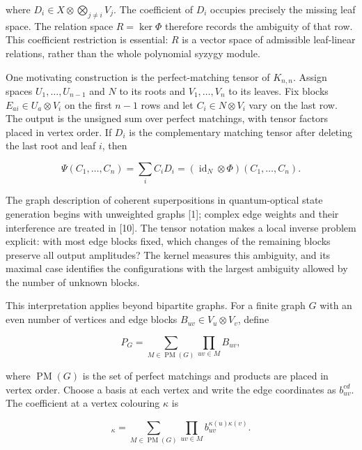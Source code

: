 \documentclass[11pt]{article}
\begin{document}
where $D_i\in X\otimes\bigotimes_{j\ne i}V_j$. The coefficient of $D_i$ occupies precisely the missing leaf space. The relation space $R=\ker\Phi$ therefore records the ambiguity of that row. This coefficient restriction is essential: $R$ is a vector space of admissible leaf-linear relations, rather than the whole polynomial syzygy module.


One motivating construction is the perfect-matching tensor of $K_{n,n}$. Assign spaces $U_1,\ldots,U_{n-1}$ and $N$ to its roots and $V_1,\ldots,V_n$ to its leaves. Fix blocks $E_{ai}\in U_a\otimes V_i$ on the first $n-1$ rows and let $C_i\in N\otimes V_i$ vary on the last row. The output is the unsigned sum over perfect matchings, with tensor factors placed in vertex order. If $D_i$ is the complementary matching tensor after deleting the last root and leaf $i$, then


\nopagebreak[4]

\begin{equation}
\Psi(C_1,\ldots,C_n)=\sum_i C_iD_i
= (\operatorname{id}_N\otimes\Phi)(C_1,\ldots,C_n).
\tag{2}
\end{equation}

The graph description of coherent superpositions in quantum-optical state generation begins with unweighted graphs [1]; complex edge weights and their interference are treated in [10]. The tensor notation makes a local inverse problem explicit: with most edge blocks fixed, which changes of the remaining blocks preserve all output amplitudes? The kernel measures this ambiguity, and its maximal case identifies the configurations with the largest ambiguity allowed by the number of unknown blocks.


This interpretation applies beyond bipartite graphs. For a finite graph $G$ with an even number of vertices and edge blocks $B_{uv}\in V_u\otimes V_v$, define


\nopagebreak[4]

\begin{equation*}
P_G=\sum_{M\in\operatorname{PM}(G)}\prod_{uv\in M}B_{uv},
\end{equation*}

where $\operatorname{PM}(G)$ is the set of perfect matchings and products are placed in vertex order. Choose a basis at each vertex and write the edge coordinates as $b_{uv}^{cd}$. The coefficient at a vertex colouring $\kappa$ is


\nopagebreak[4]

\begin{equation*}
[P_G]_{\kappa}=\sum_{M\in\operatorname{PM}(G)}\prod_{uv\in M}b_{uv}^{\kappa(u)\kappa(v)}.
\end{equation*}
\end{document}
